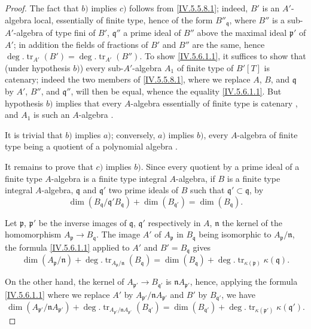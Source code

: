 \begin{proof}
The fact that $b)$ implies $c)$ follows from \eqref{IV.5.5.8.1}; indeed, $B'$ is an $A'$-algebra local, essentially of finite type, hence of the form $B''_\mathfrak{q}$, where $B''$ is a sub-$A'$-algebra of type fini of $B'$, $\mathfrak{q}''$ a prime ideal of $B''$ above the maximal ideal $\mathfrak{p}'$ of $A'$; in addition the fields of fractions of $B'$ and $B''$ are the same, hence $\deg.\operatorname{tr}_{A'}(B')=\deg.\operatorname{tr}_{A'}(B'')$.
To show \eqref{IV.5.6.1.1}, it suffices to show that (under hypothesis $b)$) every sub-$A'$-algebra $A_1$ of finite type of $B'[T]$ is catenary; indeed the two members of \eqref{IV.5.5.8.1}, where we replace $A$, $B$, and $\mathfrak{q}$ by $A'$, $B''$, and $\mathfrak{q}''$, will then be equal, whence the equality \eqref{IV.5.6.1.1}.
But hypothesis $b)$ implies that every $A$-algebra essentially of finite type is catenary , and $A_1$ is such an $A$-algebra .

It is trivial that $b)$ implies $a)$; conversely, $a)$ implies $b)$, every $A$-algebra of finite type being a quotient of a polynomial algebra .

It remains to prove that $c)$ implies $b)$.
Since every quotient by a prime ideal of a finite type $A$-algebra is a finite type integral $A$-algebra, if $B$ is a finite type integral $A$-algebra, $\mathfrak{q}$ and $\mathfrak{q}'$ two prime ideals of $B$ such that $\mathfrak{q}'\subset\mathfrak{q}$, by 
\[
\tag{5.6.1.2}\label{IV.5.6.1.2}
  \dim(B_\mathfrak{q}/\mathfrak{q}'B_\mathfrak{q}) + \dim(B_{\mathfrak{q}'}) = \dim(B_\mathfrak{q}).
\]


Let $\mathfrak{p}$, $\mathfrak{p}'$ be the inverse images of $\mathfrak{q}$, $\mathfrak{q}'$ respectively in $A$, $\mathfrak{n}$ the kernel of the homomorphism $A_\mathfrak{p}\to B_\mathfrak{q}$.
The image $A'$ of $A_\mathfrak{p}$ in $B_\mathfrak{q}$ being isomorphic to $A_\mathfrak{p}/\mathfrak{n}$, the formula \eqref{IV.5.6.1.1} applied to $A'$ and $B'=B_\mathfrak{q}$ gives
\[
\tag{5.6.1.3}\label{IV.5.6.1.3}
  \dim(A_\mathfrak{p}/\mathfrak{n}) + \deg.\operatorname{tr}_{A_\mathfrak{p}/\mathfrak{n}}(B_\mathfrak{q}) = \dim(B_\mathfrak{q}) + \deg.\operatorname{tr}_{\kappa(\mathfrak{p})}\kappa(\mathfrak{q}).
\]

On the other hand, the kernel of $A_{\mathfrak{p}'}\to B_{\mathfrak{q}'}$ is $\mathfrak{n}A_{\mathfrak{p}'}$, hence, applying the formula \eqref{IV.5.6.1.1} where we replace $A'$ by $A_{\mathfrak{p}'}/\mathfrak{n}A_{\mathfrak{p}'}$ and $B'$ by $B_{\mathfrak{q}'}$, we have
\[
\tag{5.6.1.4}\label{IV.5.6.1.4}
  \dim(A_{\mathfrak{p}'}/\mathfrak{n}A_{\mathfrak{p}'}) + \deg.\operatorname{tr}_{A_{\mathfrak{p}'}/\mathfrak{n}A_{\mathfrak{p}'}}(B_{\mathfrak{q}'}) = \dim(B_{\mathfrak{q}'}) + \deg.\operatorname{tr}_{\kappa(\mathfrak{p}')}\kappa(\mathfrak{q}').
\]


\end{proof}
